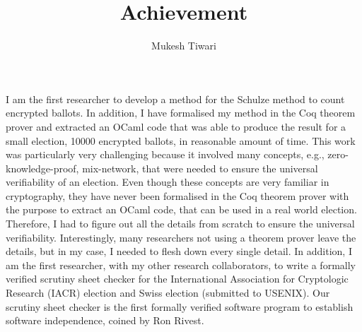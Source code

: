 \documentclass[a4paper]{article}
\title{Achievement}
\author{Mukesh Tiwari}
\date{}
\begin{document}
\fontsize{12}{15}
\selectfont
\maketitle


I am the first researcher to develop a method for the Schulze method 
to count encrypted ballots. In addition, I have formalised my method 
in the Coq theorem prover  and extracted an OCaml code that was 
able to produce the result for a small election, 10000 encrypted ballots, 
in reasonable amount of time. This work was particularly very challenging 
because it involved many concepts, e.g., zero-knowledge-proof, 
mix-network, that were needed to ensure the universal verifiability 
of an election. Even though these concepts are very familiar in 
cryptography, they have never been formalised in the Coq theorem 
prover with the purpose to extract an OCaml code, that can be used 
in a real world election. Therefore, I had to figure out all the 
details from scratch to ensure the universal verifiability. Interestingly, 
many researchers not using a theorem prover leave the details, but 
in my case, I needed to flesh down every single detail. In addition, 
I am  the first researcher, with my other research collaborators,
to write a formally verified scrutiny sheet checker for 
the International Association for Cryptologic Research (IACR) election and 
Swiss election (submitted to USENIX). Our scrutiny sheet checker is the first formally verified 
software program to establish software independence, coined by Ron 
Rivest.
\end{document}
